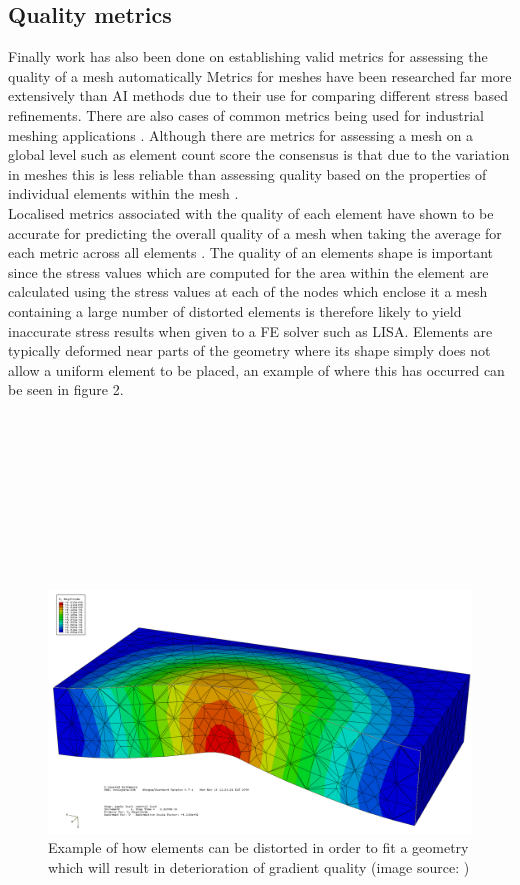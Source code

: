 \subsection{Quality metrics}
\noindent
Finally work has also been done on establishing valid metrics for assessing the quality of a mesh automatically \cite{DittmerMeshQualityMet, NeuralNetworks} Metrics for meshes have been researched far more extensively than AI methods due to their use for comparing different stress based refinements. There are also cases of common metrics being used for industrial meshing applications \cite{DittmerMeshQualityMet}. Although there are metrics for assessing a mesh on a global level such as element count score the consensus is that due to the variation in meshes this is less reliable than assessing quality based on the properties of individual elements within the mesh \cite{DittmerMeshQualityMet}. \\

\noindent
Localised metrics associated with the quality of each element have shown to be accurate for predicting the overall quality of a mesh when taking the average for each metric across all elements \cite{DittmerMeshQualityMet}. The quality of an elements shape is important since the stress values which are computed for the area within the element are calculated using the stress values at each of the nodes which enclose it \cite{IntroductionToFE} a mesh containing a large number of distorted elements is therefore likely to yield inaccurate stress results when given to a FE solver such as LISA. Elements are typically deformed near parts of the geometry where its shape simply does not allow a uniform element to be placed, an example of where this has occurred can be seen in figure 2.\\ \\ \\ \\ \\ \\ \\ \\ \\ \\ 

\begin{figure}[!h]
  \centerline{\includegraphics[width=120mm, scale=1]{../Graphics/MeshQualityDeterioration.png}}
  \caption{Example of how elements can be distorted in order to fit a geometry which will result in deterioration of gradient quality (image source: \cite{PoorFEElementShapes})}
\end{figure}

